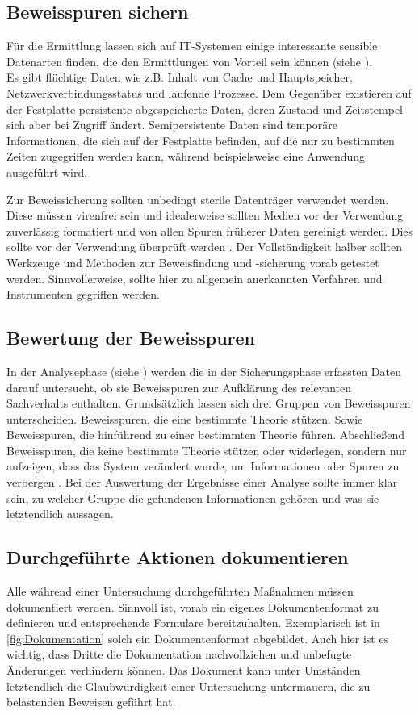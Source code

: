 \documentclass[12pt,DIV=14, version=first, BCOR=10mm,a4paper,twoside,parskip=half-,headsepline,headinclude]{scrartcl}
\begin{document}
    \subsection{Beweisspuren sichern}
    Für die Ermittlung lassen sich auf IT-Systemen einige interessante sensible Datenarten finden, die den Ermittlungen von Vorteil sein können (siehe ).\\
    Es gibt flüchtige Daten wie z.B. Inhalt von Cache und Hauptspeicher, Netzwerkverbindungsstatus und laufende Prozesse.
    Dem Gegenüber existieren auf der Festplatte persistente abgespeicherte Daten, deren Zustand und Zeitstempel sich aber bei Zugriff ändert. Semipersistente Daten sind temporäre Informationen, die sich auf der Festplatte befinden, auf die nur zu bestimmten Zeiten zugegriffen werden kann, während beispielsweise eine Anwendung ausgeführt wird.
    
    Zur Beweissicherung sollten unbedingt sterile Datenträger verwendet werden. Diese müssen virenfrei sein und idealerweise sollten Medien vor der Verwendung zuverlässig formatiert und von allen Spuren früherer Daten gereinigt werden. Dies sollte vor der Verwendung überprüft werden \cite[vgl. S. 82]{texbook01}. 
    Der Vollständigkeit halber sollten Werkzeuge und Methoden zur Beweisfindung und -sicherung vorab getestet werden. Sinnvollerweise, sollte hier zu allgemein anerkannten Verfahren und Instrumenten gegriffen werden.

    \subsection{Bewertung der Beweisspuren} 
    In der Analysephase (siehe ) werden die in der Sicherungsphase erfassten Daten darauf untersucht, ob sie Beweisspuren zur Aufklärung des relevanten Sachverhalts enthalten. Grundsätzlich lassen sich drei Gruppen von Beweisspuren unterscheiden.  Beweisspuren, die eine bestimmte Theorie stützen. Sowie Beweisspuren, die hinführend zu einer bestimmten Theorie führen. Abschließend Beweisspuren, die keine bestimmte Theorie stützen oder widerlegen, sondern nur aufzeigen, dass das System verändert wurde, um Informationen oder Spuren zu verbergen \cite[vgl. S. 83]{texbook01}. Bei der Auswertung der Ergebnisse einer Analyse sollte immer klar sein, zu welcher Gruppe die gefundenen Informationen gehören und was sie letztendlich aussagen.
    
	\subsection{Durchgeführte Aktionen dokumentieren}
    Alle während einer Untersuchung durchgeführten Maßnahmen müssen dokumentiert werden. Sinnvoll ist, vorab ein eigenes Dokumentenformat zu definieren und entsprechende Formulare bereitzuhalten. Exemplarisch ist in \autoref{fig:Dokumentation} solch ein Dokumentenformat abgebildet. Auch hier ist es wichtig, dass Dritte die Dokumentation nachvollziehen und unbefugte Änderungen verhindern können. Das Dokument kann unter Umständen letztendlich die Glaubwürdigkeit einer Untersuchung untermauern, die zu belastenden Beweisen geführt hat.    
    
\end{document}
